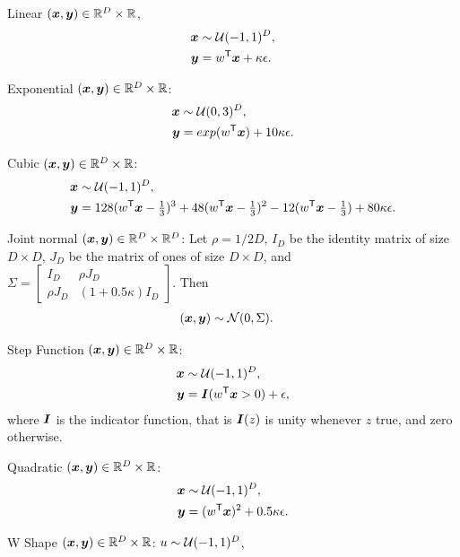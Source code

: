 \documentclass[11pt]{article}
\begin{document}
\setcounter{equation}{0}
\begin{compactenum}
\item Linear $(\boldsymbol{x},\boldsymbol{y}) \in \mathbb{R}^{D} \times \mathbb{R}$,
\begin{align*}
\boldsymbol{x} &\sim \mathcal{U}(-1,1)^{D},\\
\boldsymbol{y} &=w^{\mathsf{T}} \boldsymbol{x}+\kappa\epsilon.
\end{align*}
\item Exponential $(\boldsymbol{x},\boldsymbol{y}) \in \mathbb{R}^{D} \times \mathbb{R}$:
\begin{align*}
\boldsymbol{x} &\sim \mathcal{U}(0,3)^{D}, \\
\boldsymbol{y} &=exp(w^{\mathsf{T}} \boldsymbol{x})+10\kappa\epsilon.
\end{align*}
\item Cubic $(\boldsymbol{x},\boldsymbol{y}) \in \mathbb{R}^{D} \times \mathbb{R}$:
\begin{align*}
\boldsymbol{x} &\sim \mathcal{U}(-1,1)^{D}, \\
\boldsymbol{y} &=128(w^{\mathsf{T}} \boldsymbol{x}-\tfrac{1}{3})^3+48(w^{\mathsf{T}} \boldsymbol{x}-\tfrac{1}{3})^2-12(w^{\mathsf{T}} \boldsymbol{x}-\tfrac{1}{3})+80\kappa\epsilon.
\end{align*}
\item Joint normal $(\boldsymbol{x},\boldsymbol{y}) \in \mathbb{R}^{D} \times \mathbb{R}^{D}$: Let $\rho=1/2D$, $I_{D}$ be the identity matrix of size $D \times D$, $J_{D}$ be the matrix of ones of size $D \times D$, and $\Sigma = \begin{bmatrix} I_{D}&\rho J_{D}\\ \rho J_{D}& (1+0.5\kappa) I_{D} \end{bmatrix}$. Then
\begin{align*}
(\boldsymbol{x}, \boldsymbol{y}) &\sim \mathcal{N}(0, \Sigma). 
\end{align*}
\item Step Function $(\boldsymbol{x},\boldsymbol{y}) \in \mathbb{R}^{D} \times \mathbb{R}$:
\begin{align*}
\boldsymbol{x} &\sim \mathcal{U}(-1,1)^{D},\\
\boldsymbol{y} &=\boldsymbol{I}(w^{\mathsf{T}} \boldsymbol{x}>0)+\epsilon,
\end{align*}
where $\boldsymbol{I}$ is the indicator function, that is $\boldsymbol{I}(z)$ is unity whenever $z$ true, and zero otherwise.
\item Quadratic $(\boldsymbol{x},\boldsymbol{y}) \in \mathbb{R}^{D} \times \mathbb{R}$:
\begin{align*}
\boldsymbol{x} &\sim \mathcal{U}(-1,1)^{D},\\
\boldsymbol{y}&=(w^{\mathsf{T}} \boldsymbol{x})^2+0.5\kappa\epsilon.
\end{align*}
\item W Shape $(\boldsymbol{x},\boldsymbol{y}) \in \mathbb{R}^{D} \times \mathbb{R}$:  $u \sim \mathcal{U}(-1,1)^{D}$,

\end{compactenum}
\end{document}
